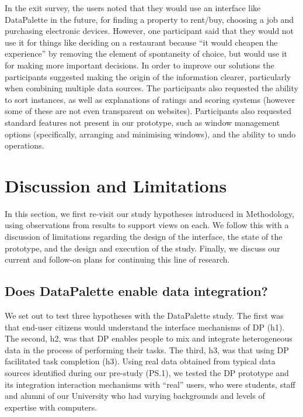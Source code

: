 \documentclass{sigchi}
\begin{document}

In the exit survey, the users noted that they would use an interface like DataPalette in the future, for finding a property to rent/buy, choosing a job and purchasing electronic devices.  However, one participant said that they would not use it for things like deciding on a restaurant because ``it would cheapen the experience'' by removing the element of spontaneity of choice, but would use it for making more important decisions.  In order to improve our solutions the participants suggested making the origin of the information clearer, particularly when combining multiple data sources. The participants also requested the ability to sort instances, as well as explanations of ratings and scoring systems (however some of these are not even transparent on websites). Participants also requested standard features not present in our prototype, such as window management options (specifically, arranging and minimising windows), and the ability to undo operations.

\section{Discussion and Limitations}

In this section, we first re-visit our study hypotheses introduced in Methodology, using observations from results to support views on each.  We follow this with a discussion of limitations regarding the design of the interface, the state of the prototype, and the design and execution of the study.  Finally, we discuss our current and follow-on plans for continuing this line of research.

\subsection{Does DataPalette enable data integration?}
We set out to test three hypotheses with the DataPalette study. The first was that end-user citizens would understand the interface mechanisms of DP (h1).  The second, h2, was that DP enables people to mix and integrate heterogeneous data in the process of performing their tasks.  The third, h3, was that using DP facilitated task completion (h3).  Using real data obtained from typical data sources identified during our pre-study (PS.1), we tested the DP prototype and its integration interaction mechanisms with ``real'' users, who were students, staff and alumni of our University who had varying backgrounds and levels of expertise with computers.
\end{document}
